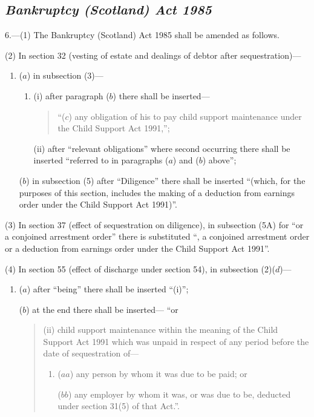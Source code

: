 \documentclass[12pt,a4paper]{article}
\begin{document}
\subsection*{\itshape Bankruptcy (Scotland) Act 1985}

6.---(1) The Bankruptcy (Scotland) Act 1985 shall be amended as follows.

(2) In section 32 (vesting of estate and dealings of debtor after sequestration)—
\begin{enumerate}\item[]
($a$) in subsection (3)—
\begin{enumerate}\item[]
(i) after paragraph ($b$)  there shall be inserted—
\begin{quotation}
“($c$) any obligation of his to pay child support maintenance under the Child Support Act 1991,”;
\end{quotation}

(ii) after “relevant obligations” where second occurring there shall be inserted “referred to in paragraphs ($a$)  and ($b$)  above”;
\end{enumerate}

($b$) in subsection (5)  after “Diligence” there shall be inserted “(which, for the purposes of this section, includes the making of a deduction from earnings order under the Child Support Act 1991)”.
\end{enumerate}

(3) In section 37 (effect of sequestration on diligence), in subsection (5A)  for “or a conjoined arrestment order” there is substituted “, a conjoined arrestment order or a deduction from earnings order under the Child Support Act 1991”.

(4) In section 55 (effect of discharge under section 54), in subsection (2)($d$)—
\begin{enumerate}\item[]
($a$) after “being” there shall be inserted “(i)”;

($b$) at the end there shall be inserted— “or
\begin{quotation}
(ii) child support maintenance within the meaning of the Child Support Act 1991 which was unpaid in respect of any period before the date of sequestration of—
\begin{enumerate}\item[]
($aa$) any person by whom it was due to be paid; or

($bb$) any employer by whom it was, or was due to be, deducted under section 31(5)  of that Act.”.
\end{enumerate}
\end{quotation}
\end{enumerate}
\end{document}
